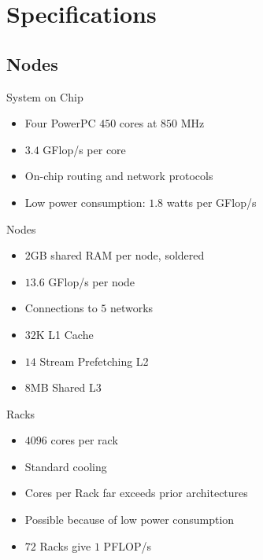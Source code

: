 \documentclass{beamer}
\begin{document}
\section{Specifications}
\subsection{Nodes}
\begin{frame}{System on Chip}
\begin{itemize}
\item Four PowerPC $450$ cores at $850$ MHz
\item $3.4$ GFlop/s per core
\item On-chip routing and network protocols
\item Low power consumption: $1.8$ watts per GFlop/s
\end{itemize}
\end{frame}

\begin{frame}{Nodes}
\begin{itemize}
\item $2$GB shared RAM per node, soldered
\item $13.6$ GFlop/s per node
\item Connections to $5$ networks
\item $32$K L1 Cache
\item $14$ Stream Prefetching L2
\item $8$MB Shared L3
\end{itemize}
\end{frame}


\begin{frame}{Racks}
\begin{itemize}
\item $4096$ cores per rack
\item Standard cooling
\item Cores per Rack far exceeds prior architectures
\item Possible because of low power consumption
\item $72$ Racks give $1$ PFLOP/s
\end{itemize}
\end{frame}
\end{document}
